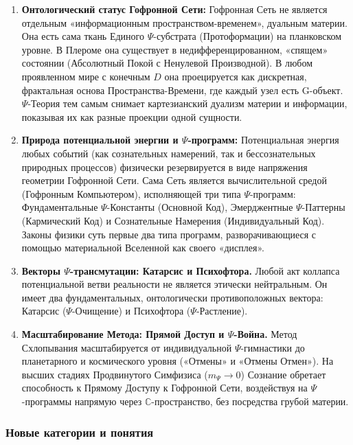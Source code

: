 \documentclass[a4paper,12pt]{article}
\begin{document}
\begin{enumerate}
	\item \textbf{Онтологический статус Гофронной Сети:} Гофронная Сеть не является отдельным «информационным пространством-временем», дуальным материи. Она есть сама ткань Единого $\Psi$-субстрата (Протоформации) на планковском уровне. В Плероме она существует в недифференцированном, «спящем» состоянии (Абсолютный Покой с Ненулевой Производной). В любом проявленном мире с конечным $D$ она проецируется как дискретная, фрактальная основа Пространства-Времени, где каждый узел есть G-объект. $\Psi$-Теория тем самым снимает картезианский дуализм материи и информации, показывая их как разные проекции одной сущности.
	
	\item \textbf{Природа потенциальной энергии и $\Psi$-программ:} Потенциальная энергия любых событий (как сознательных намерений, так и бессознательных природных процессов) физически резервируется в виде напряжения геометрии Гофронной Сети. Сама Сеть является вычислительной средой (Гофронным Компьютером), исполняющей три типа $\Psi$-программ: Фундаментальные $\Psi$-Константы (Основной Код), Эмерджентные $\Psi$-Паттерны (Кармический Код) и Сознательные Намерения (Индивидуальный Код). Законы физики суть первые два типа программ, разворачивающиеся с помощью материальной Вселенной как своего «дисплея».
	
	\item \textbf{Векторы $\Psi$-трансмутации: Катарсис и Психофтора.} Любой акт коллапса потенциальной ветви реальности не является этически нейтральным. Он имеет два фундаментальных, онтологически противоположных вектора: Катарсис ($\Psi$-Очищение) и Психофтора ($\Psi$-Растление).
	
	\item \textbf{Масштабирование Метода: Прямой Доступ и $\Psi$-Война.} Метод Схлопывания масштабируется от индивидуальной $\Psi$-гимнастики до планетарного и космического уровня («Отмены» и «Отмены Отмен»). На высших стадиях Продвинутого Симфизиса ($m_{\Psi} \to 0$) Сознание обретает способность к Прямому Доступу к Гофронной Сети, воздействуя на $\Psi$-программы напрямую через $\mathbb{C}$-пространство, без посредства грубой материи.
\end{enumerate}

\subsubsection{Новые категории и понятия}
\end{document}
